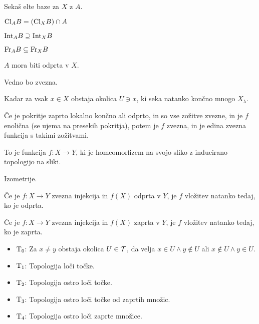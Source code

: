 Sekaš elte baze za $X$ z $A$.


$\text{Cl}_A B = (\text{Cl}_X B) \cap A$

$\text{Int}_A B \supseteq \text{Int}_X B$

$\text{Fr}_A B \subseteq \text{Fr}_X B$


$A$ mora biti odprta v $X$.


Vedno bo zvezna.


Kadar za vsak $x \in X$ obstaja okolica $U \ni x$, ki seka natanko končno mnogo
$X_\lambda$.


Če je pokritje zaprto lokalno končno ali odprto, in so vse zožitve zvezne,
in je $f$ enolična (se ujema na presekih pokritja), potem je $f$ zvezna,
in je edina zvezna funkcija s takimi zožitvami.


To je funkcija $f: X \to Y$, ki je homeomorfizem na svojo sliko z inducirano
topologijo na sliki.


Izometrije.


Če je $f: X \to Y$ zvezna injekcija in $f(X)$ odprta v $Y$, je $f$ vložitev
natanko tedaj, ko je odprta.

Če je $f: X \to Y$ zvezna injekcija in $f(X)$ zaprta v $Y$, je $f$ vložitev
natanko tedaj, ko je zaprta.


\begin{itemize}
  \item $\text{T}_{0}$: Za $x \ne y$ obstaja okolica $U \in \mathcal{T}$, da velja
  $x \in U \land y \notin U$ ali $x \notin U \land y \in U$.
  \item $\text{T}_{1}$: Topologija loči točke.
  \item $\text{T}_{2}$: Topologija ostro loči točke.
  \item $\text{T}_{3}$: Topologija ostro loči točke od zaprtih množic.
  \item $\text{T}_{4}$: Topologija ostro loči zaprte množice.
\end{itemize}


